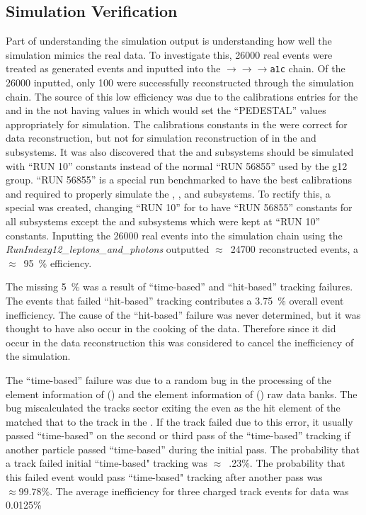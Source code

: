 \subsection{Simulation Verification}\label{sec:analysis.accept.verify}
Part of understanding the simulation output is understanding how well the simulation mimics the real data. To investigate this, 26000 real \epemT events were treated as generated events and inputted into the $\to$$\to$$\to$\texttt{a1c} chain. Of the 26000 inputted, only 100 were successfully reconstructed through the simulation chain. The source of this low efficiency was due to the calibrations entries for the  and  in the  not having values in which would set the ``PEDESTAL'' values appropriately for simulation. The calibrations constants in the  were correct for data reconstruction, but not for simulation reconstruction of \epemT in the  and  subsystems. It was also discovered that the  and  subsystems should be simulated with ``RUN 10'' constants instead of the normal ``RUN 56855'' used by the g12 group. ``RUN 56855'' is a special run benchmarked to have the best calibrations and required to properly simulate the , , and  subsystems. To rectify this, a special  was created, changing ``RUN 10'' for to have ``RUN 56855'' constants for all subsystems except the  and  subsystems which were kept at ``RUN 10'' constants. Inputting the 26000 real \epemT events into the simulation chain using the  \emph{RunIndexg12\_leptons\_and\_photons} outputted $\approx$~24700 \epemT reconstructed events, a $\approx$~95~\% efficiency.

The missing 5~\% was a result of ``time-based'' and ``hit-based'' tracking failures. The events that failed ``hit-based'' tracking contributes a 3.75~\% overall event inefficiency. The cause of the ``hit-based'' failure was never determined, but it was thought to have also occur in the cooking of the data. Therefore since it did occur in the data reconstruction this was considered to cancel the inefficiency of the simulation.

The ``time-based'' failure was due to a random bug in the processing of the  element information of  () and the  element information of  () raw data banks. The bug miscalculated the tracks sector exiting the  even as the hit element of the  matched that to the track in the . If the track failed due to this error, it usually passed ``time-based'' on the second or third pass of the ``time-based'' tracking if another particle passed ``time-based'' during the initial pass. The probability that a track failed initial ``time-based" tracking was $\approx$~.23\%. The probability that this failed event would pass ``time-based" tracking after another pass was $\approx99.78\%$. The average inefficiency for three charged track events for data was 0.0125\%

